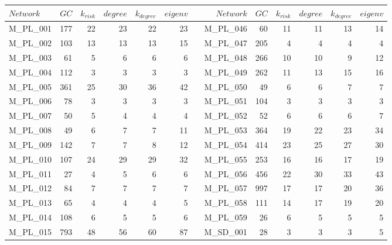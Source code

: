 \begin{table}[htbp]
\fontsize{2.3mm}{2.3mm}\selectfont
  \centering
    \begin{tabular}{lrrrrrrrrrrrr}
    \toprule
    $Network$ & $GC$ & $k_{risk}$ & $degree$ & $k_{degree}$ & $eigenv$ &    &$Network$ & $GC$ & $k_{risk}$ & $degree$ & $k_{degree}$ & $eigenv$ \\
    \midrule
        M\_PL\_001 & 177  & 22   & 23   & 22   & 23   &      & M\_PL\_046 & 60   & 11   & 11   & 13   & 14 \\
    M\_PL\_002 & 103  & 13   & 13   & 13   & 15   &      & M\_PL\_047 & 205  & 4    & 4    & 4    & 4 \\
    M\_PL\_003 & 61   & 5    & 6    & 6    & 6    &      & M\_PL\_048 & 266  & 10   & 10   & 9    & 12 \\
    M\_PL\_004 & 112  & 3    & 3    & 3    & 3    &      & M\_PL\_049 & 262  & 11   & 13   & 15   & 16 \\
    M\_PL\_005 & 361  & 25   & 30   & 36   & 42   &      & M\_PL\_050 & 49   & 6    & 6    & 7    & 7 \\
    M\_PL\_006 & 78   & 3    & 3    & 3    & 3    &      & M\_PL\_051 & 104  & 3    & 3    & 3    & 3 \\
    M\_PL\_007 & 50   & 5    & 4    & 4    & 4    &      & M\_PL\_052 & 52   & 6    & 6    & 6    & 7 \\
    M\_PL\_008 & 49   & 6    & 7    & 7    & 11   &      & M\_PL\_053 & 364  & 19   & 22   & 23   & 34 \\
    M\_PL\_009 & 142  & 7    & 7    & 8    & 12   &      & M\_PL\_054 & 414  & 23   & 25   & 27   & 30 \\
    M\_PL\_010 & 107  & 24   & 29   & 29   & 32   &      & M\_PL\_055 & 253  & 16   & 16   & 17   & 19 \\
    M\_PL\_011 & 27   & 4    & 5    & 6    & 6    &      & M\_PL\_056 & 456  & 22   & 30   & 33   & 43 \\
    M\_PL\_012 & 84   & 7    & 7    & 7    & 7    &      & M\_PL\_057 & 997  & 17   & 17   & 20   & 36 \\
    M\_PL\_013 & 65   & 4    & 4    & 4    & 5    &      & M\_PL\_058 & 111  & 14   & 17   & 19   & 20 \\
    M\_PL\_014 & 108  & 6    & 5    & 5    & 6    &      & M\_PL\_059 & 26   & 6    & 5    & 5    & 5 \\
    M\_PL\_015 & 793  & 48   & 56   & 60   & 87   &      & M\_SD\_001 & 28   & 3    & 3    & 3    & 5 \\

\end{tabular}
\end{table}
